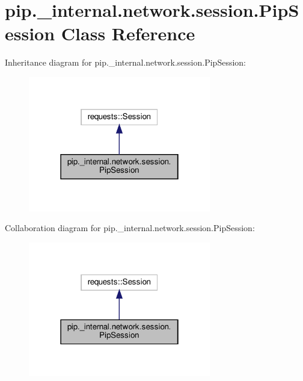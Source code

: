\hypertarget{classpip_1_1__internal_1_1network_1_1session_1_1PipSession}{}\section{pip.\+\_\+internal.\+network.\+session.\+Pip\+Session Class Reference}
\label{classpip_1_1__internal_1_1network_1_1session_1_1PipSession}


Inheritance diagram for pip.\+\_\+internal.\+network.\+session.\+Pip\+Session\+:
\nopagebreak
\begin{figure}[H]
\begin{center}
\leavevmode
\includegraphics[width=226pt]{classpip_1_1__internal_1_1network_1_1session_1_1PipSession__inherit__graph}
\end{center}
\end{figure}


Collaboration diagram for pip.\+\_\+internal.\+network.\+session.\+Pip\+Session\+:
\nopagebreak
\begin{figure}[H]
\begin{center}
\leavevmode
\includegraphics[width=226pt]{classpip_1_1__internal_1_1network_1_1session_1_1PipSession__coll__graph}
\end{center}
\end{figure}
